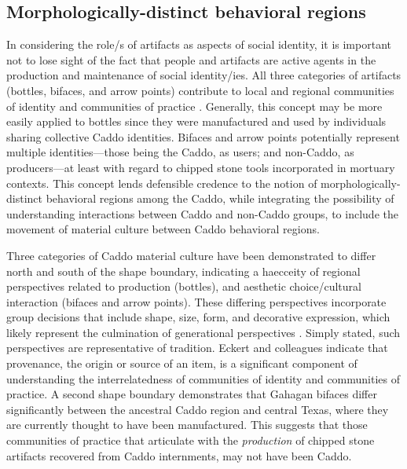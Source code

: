 \documentclass[smallextended]{svjour3}       %
\begin{document}
\hypertarget{morphologically-distinct-behavioral-regions}{%
\subsection{Morphologically-distinct behavioral
regions}\label{morphologically-distinct-behavioral-regions}}

In considering the role/s of artifacts as aspects of social identity, it
is important not to lose sight of the fact that people and artifacts are
active agents in the production and maintenance of social identity/ies.
All three categories of artifacts (bottles, bifaces, and arrow points)
contribute to local and regional communities of identity and communities
of practice \cite{RN8061}. Generally, this concept may be more easily
applied to bottles since they were manufactured and used by individuals
sharing collective Caddo identities. Bifaces and arrow points
potentially represent multiple identities---those being the Caddo, as
users; and non-Caddo, as producers---at least with regard to chipped
stone tools incorporated in mortuary contexts. This concept lends
defensible credence to the notion of morphologically-distinct behavioral
regions among the Caddo, while integrating the possibility of
understanding interactions between Caddo and non-Caddo groups, to
include the movement of material culture between Caddo behavioral
regions.

Three categories of Caddo material culture have been demonstrated to
differ north and south of the shape boundary, indicating a haecceity of
regional perspectives related to production (bottles), and aesthetic
choice/cultural interaction (bifaces and arrow points). These differing
perspectives incorporate group decisions that include shape, size, form,
and decorative expression, which likely represent the culmination of
generational perspectives \cite{RN5610}. Simply stated, such
perspectives are representative of tradition. Eckert and colleagues
\cite{RN8061} indicate that provenance, the origin or source of an item,
is a significant component of understanding the interrelatedness of
communities of identity and communities of practice. A second shape
boundary demonstrates that Gahagan bifaces differ significantly between
the ancestral Caddo region and central Texas, where they are currently
thought to have been manufactured. This suggests that those communities
of practice that articulate with the \emph{production} of chipped stone
artifacts recovered from Caddo internments, may not have been Caddo.
\end{document}
